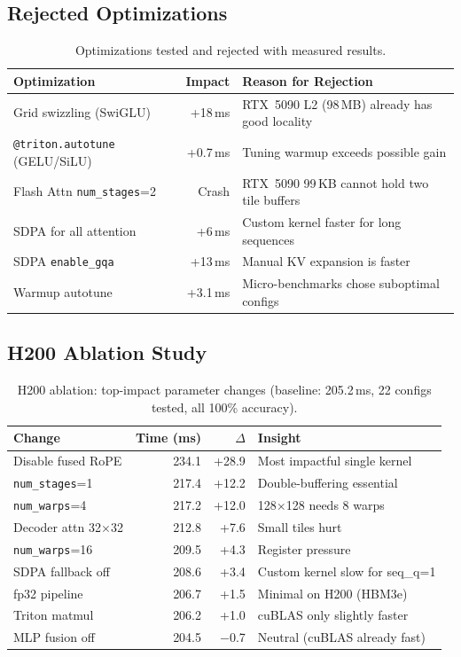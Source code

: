 \documentclass{article}
\begin{document}
\subsection{Rejected Optimizations}

\begin{table}[h]
\centering
\caption{Optimizations tested and rejected with measured results.}
\label{tab:rejected}
\small
\begin{tabular}{@{}lrl@{}}
\toprule
\textbf{Optimization} & \textbf{Impact} & \textbf{Reason for Rejection} \\
\midrule
Grid swizzling (SwiGLU) & +18\,ms & RTX~5090 L2 (98\,MB) already has good locality \\
\texttt{@triton.autotune} (GELU/SiLU) & +0.7\,ms & Tuning warmup exceeds possible gain \\
Flash Attn \texttt{num\_stages}=2 & Crash & RTX~5090 99\,KB cannot hold two tile buffers \\
SDPA for all attention & +6\,ms & Custom kernel faster for long sequences \\
SDPA \texttt{enable\_gqa} & +13\,ms & Manual KV expansion is faster \\
Warmup autotune & +3.1\,ms & Micro-benchmarks chose suboptimal configs \\
\bottomrule
\end{tabular}
\end{table}

\subsection{H200 Ablation Study}

\begin{table}[h]
\centering
\caption{H200 ablation: top-impact parameter changes (baseline: 205.2\,ms, 22 configs tested, all 100\% accuracy).}
\label{tab:ablation}
\small
\begin{tabular}{@{}lrrl@{}}
\toprule
\textbf{Change} & \textbf{Time (ms)} & \textbf{$\Delta$} & \textbf{Insight} \\
\midrule
Disable fused RoPE & 234.1 & +28.9 & Most impactful single kernel \\
\texttt{num\_stages}=1 & 217.4 & +12.2 & Double-buffering essential \\
\texttt{num\_warps}=4 & 217.2 & +12.0 & 128$\times$128 needs 8 warps \\
Decoder attn 32$\times$32 & 212.8 & +7.6 & Small tiles hurt \\
\texttt{num\_warps}=16 & 209.5 & +4.3 & Register pressure \\
SDPA fallback off & 208.6 & +3.4 & Custom kernel slow for seq\_q=1 \\
fp32 pipeline & 206.7 & +1.5 & Minimal on H200 (HBM3e) \\
Triton matmul & 206.2 & +1.0 & cuBLAS only slightly faster \\
MLP fusion off & 204.5 & $-$0.7 & Neutral (cuBLAS already fast) \\
\bottomrule
\end{tabular}
\end{table}
\end{document}
